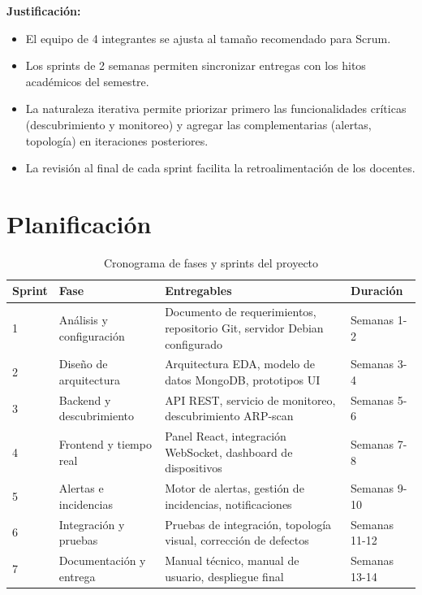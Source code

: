 \documentclass[12pt,a4paper]{report}
\begin{document}
\textbf{Justificación:}
\begin{itemize}
  \item El equipo de 4 integrantes se ajusta al tamaño recomendado para Scrum.
  \item Los sprints de 2 semanas permiten sincronizar entregas con los hitos académicos del semestre.
  \item La naturaleza iterativa permite priorizar primero las funcionalidades críticas (descubrimiento y monitoreo) y agregar las complementarias (alertas, topología) en iteraciones posteriores.
  \item La revisión al final de cada sprint facilita la retroalimentación de los docentes.
\end{itemize}

\section{Planificación}

\begin{table}[htbp]
\centering
\caption{Cronograma de fases y sprints del proyecto}\label{tab:cronograma}
\small
\begin{tabularx}{\textwidth}{p{1.2cm} p{3.8cm} X p{2.8cm}}
\toprule
\textbf{Sprint} & \textbf{Fase} & \textbf{Entregables} & \textbf{Duración} \\
\midrule
1 & Análisis y configuración & Documento de requerimientos, repositorio Git, servidor Debian configurado & Semanas 1-2 \\
\midrule
2 & Diseño de arquitectura & Arquitectura EDA, modelo de datos MongoDB, prototipos UI & Semanas 3-4 \\
\midrule
3 & Backend y descubrimiento & API REST, servicio de monitoreo, descubrimiento ARP-scan & Semanas 5-6 \\
\midrule
4 & Frontend y tiempo real & Panel React, integración WebSocket, dashboard de dispositivos & Semanas 7-8 \\
\midrule
5 & Alertas e incidencias & Motor de alertas, gestión de incidencias, notificaciones & Semanas 9-10 \\
\midrule
6 & Integración y pruebas & Pruebas de integración, topología visual, corrección de defectos & Semanas 11-12 \\
\midrule
7 & Documentación y entrega & Manual técnico, manual de usuario, despliegue final & Semanas 13-14 \\
\bottomrule
\end{tabularx}
\end{table}
\end{document}
